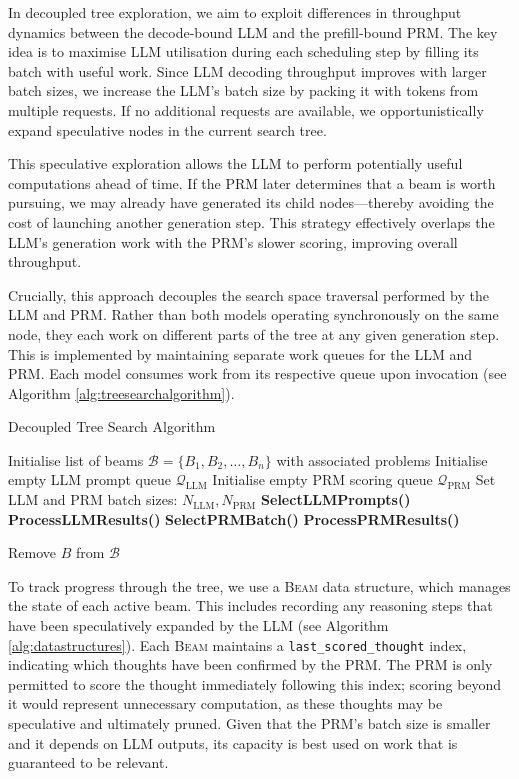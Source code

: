 \documentclass[11pt,twoside]{report}
\begin{document}
In decoupled tree exploration, we aim to exploit differences in throughput dynamics between the decode-bound LLM and the prefill-bound PRM. 
The key idea is to maximise LLM utilisation during each scheduling step by filling its batch with useful work. 
Since LLM decoding throughput improves with larger batch sizes, we increase the LLM’s batch size by packing it with tokens from multiple requests. 
If no additional requests are available, we opportunistically expand speculative nodes in the current search tree.

This speculative exploration allows the LLM to perform potentially useful computations ahead of time. 
If the PRM later determines that a beam is worth pursuing, we may already have generated its child nodes—thereby avoiding the cost of launching another generation step. 
This strategy effectively overlaps the LLM’s generation work with the PRM’s slower scoring, improving overall throughput.

Crucially, this approach decouples the search space traversal performed by the LLM and PRM. 
Rather than both models operating synchronously on the same node, they each work on different parts of the tree at any given generation step. 
This is implemented by maintaining separate work queues for the LLM and PRM. Each model consumes work from its respective queue upon invocation (see Algorithm \ref{alg:treesearchalgorithm}).

\begin{algorithm}[H]\label{alg:treesearchalgorithm}
\caption{Decoupled Tree Search Algorithm} 
\begin{algorithmic}[1]
\State Initialise list of beams $\mathcal{B} = \{B_1, B_2, \dots, B_n\}$ with associated problems
\State Initialise empty LLM prompt queue $\mathcal{Q}_{\text{LLM}}$
\State Initialise empty PRM scoring queue $\mathcal{Q}_{\text{PRM}}$
\State Set LLM and PRM batch sizes: $N_{\text{LLM}}, N_{\text{PRM}}$
    \State \textbf{SelectLLMPrompts()}
    \State \textbf{ProcessLLMResults()}
    \State \textbf{SelectPRMBatch()}
    \State \textbf{ProcessPRMResults()}

        \State Remove $B$ from $\mathcal{B}$
      \EndIf
    \EndFor
\EndWhile
\end{algorithmic}
\end{algorithm}

To track progress through the tree, we use a \textsc{Beam} data structure, which manages the state of each active beam. 
This includes recording any reasoning steps that have been speculatively expanded by the LLM (see Algorithm \ref{alg:datastructures}). 
Each \textsc{Beam} maintains a \texttt{last\_scored\_thought} index, indicating which thoughts have been confirmed by the PRM. 
The PRM is only permitted to score the thought immediately following this index; scoring beyond it would represent unnecessary computation, as these thoughts may be speculative and ultimately pruned. 
Given that the PRM’s batch size is smaller and it depends on LLM outputs, its capacity is best used on work that is guaranteed to be relevant.
\end{document}
